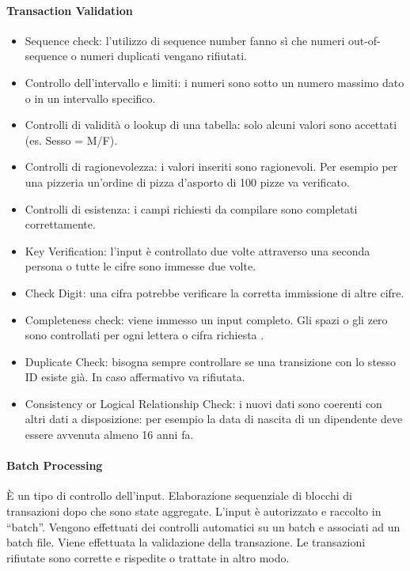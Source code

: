 \paragraph{Transaction Validation}
\begin{itemize}
	\item Sequence check: l'utilizzo di sequence number fanno sì che numeri
	out-of-sequence o numeri duplicati vengano rifiutati.
	\item Controllo dell'intervallo e limiti: i numeri sono sotto un numero
	massimo dato o in un intervallo specifico.
	\item Controlli di validità o lookup di una tabella:
	solo alcuni valori sono accettati (es. Sesso = M/F).
	\item Controlli di ragionevolezza: i valori inseriti sono ragionevoli.
	Per esempio per una pizzeria un'ordine di pizza d'asporto di 100 pizze
	va verificato.
	\item Controlli di esistenza: i campi richiesti da compilare
	sono completati correttamente.
	\item Key Verification: l'input è controllato due volte attraverso
	una seconda persona o tutte le cifre sono immesse due volte.
	\item Check Digit: una cifra potrebbe verificare la corretta
	immissione di altre cifre.
	\item Completeness check: viene immesso un input completo. Gli
	spazi o gli zero sono controllati per ogni lettera o cifra 
	richiesta .
	\item Duplicate Check: bisogna sempre controllare se una transizione
	con lo stesso ID esiste già. In caso affermativo va rifiutata.
	\item Consistency or Logical Relationship Check: i nuovi dati
	sono coerenti con altri dati a disposizione: per esempio
	la data di nascita di un dipendente deve essere avvenuta almeno
	16 anni fa.
\end{itemize}


\paragraph{Batch Processing} 
È un tipo di controllo dell'input.
Elaborazione sequenziale di blocchi di transazioni
dopo che sono state aggregate. 
L'input è autorizzato e raccolto in ``batch''. Vengono effettuati
dei controlli automatici su un batch e associati ad un batch file.
Viene effettuata la validazione della transazione. Le transazioni
rifiutate sono corrette e rispedite o trattate in altro modo.

